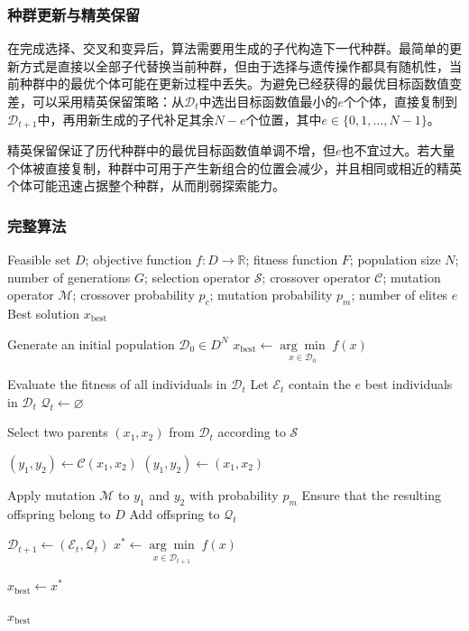 \subsubsection{种群更新与精英保留}
在完成选择、交叉和变异后，算法需要用生成的子代构造下一代种群。最简单的更新方式是直接以全部子代替换当前种群，但由于选择与遗传操作都具有随机性，当前种群中的最优个体可能在更新过程中丢失。为避免已经获得的最优目标函数值变差，可以采用精英保留策略：从$\mathcal{D}_t$中选出目标函数值最小的$e$个个体，直接复制到$\mathcal{D}_{t+1}$中，再用新生成的子代补足其余$N-e$个位置，其中$e\in\{0,1,\dots,N-1\}$。\par
精英保留保证了历代种群中的最优目标函数值单调不增，但$e$也不宜过大。若大量个体被直接复制，种群中可用于产生新组合的位置会减少，并且相同或相近的精英个体可能迅速占据整个种群，从而削弱探索能力。
\subsubsection{完整算法}
\begin{algorithm}[H]
	\caption{Genetic Algorithm}
	\label{alg:GeneticAlgorithm}
	\begin{algorithmic}[1]
		\Require Feasible set $D$; objective function $f:D\to\mathbb{R}$;
		fitness function $F$; population size $N$; number of generations $G$;
		selection operator $\mathcal{S}$; crossover operator $\mathcal{C}$;
		mutation operator $\mathcal{M}$; crossover probability $p_c$;
		mutation probability $p_m$; number of elites $e$
		\Ensure Best solution $x_{\mathrm{best}}$
		
		\State Generate an initial population $\mathcal{D}_0\in D^N$
		\State $x_{\mathrm{best}}\gets\underset{x\in\mathcal{D}_0}{\arg\min}\;f(x)$
		
		\State Evaluate the fitness of all individuals in $\mathcal{D}_t$
		\State Let $\mathcal{E}_t$ contain the $e$ best individuals in $\mathcal{D}_t$
		\State $\mathcal{Q}_t\gets\varnothing$
		
		\State Select two parents $(x_1,x_2)$ from $\mathcal{D}_t$ according to $\mathcal{S}$
		
		\State $(y_1,y_2)\gets\mathcal{C}(x_1,x_2)$
		\Else
		\State $(y_1,y_2)\gets(x_1,x_2)$
		\EndIf
		
		\State Apply mutation $\mathcal{M}$ to $y_1$ and $y_2$ with probability $p_m$
		\State Ensure that the resulting offspring belong to $D$
		\State Add offspring to $\mathcal{Q}_t$
		\EndWhile
		
		\State $\mathcal{D}_{t+1}\gets(\mathcal{E}_t,\mathcal{Q}_t)$
		\State $x^*\gets\underset{x\in\mathcal{D}_{t+1}}{\arg\min}\;f(x)$
		
		\State $x_{\mathrm{best}}\gets x^*$
		\EndIf
		\EndFor
		
		\State \Return $x_{\mathrm{best}}$
	\end{algorithmic}
\end{algorithm}